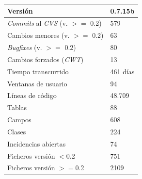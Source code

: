 \documentclass[a4paper]{article}
\begin{document}
        \begin{center}
            \begin{tabular}{|| l | l ||}
                \hline
                \hline
                Versión & 0.7.15b \\
                \hline
                \emph{Commits} al \emph{CVS} (v. $>=$ 0.2) & 579 \\
                \hline
                Cambios menores (v. $>=$ 0.2) & 63 \\
                \hline
                \emph{Bugfixes} (v. $>=$ 0.2) & 80 \\
                \hline
                Cambios forzados (\emph{CWT}) & 13 \\
                \hline
                Tiempo transcurrido & 461 días \\
                \hline
                Ventanas de usuario & 94 \\
                \hline
                Líneas de código & 48.709 \\
                \hline
                Tablas & 88 \\
                \hline
                Campos & 608 \\
                \hline
                Clases & 224 \\
                \hline
                Incidencias abiertas & 74 \\
                \hline
                Ficheros versión $<$0.2 & 751 \\
                \hline
                Ficheros versión $>=$0.2 & 2109 \\
                \hline
                \hline
            \end{tabular}
        \end{center}
\end{document}
